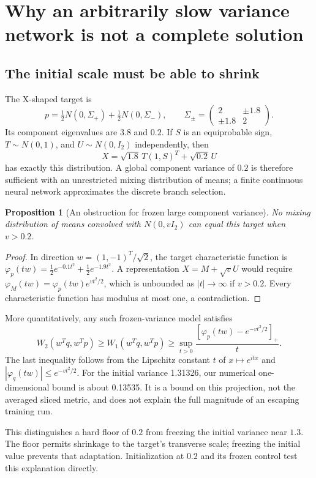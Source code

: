 \documentclass[11pt,a4paper]{article}
\newtheorem{proposition}{Proposition}[section]
\begin{document}
\section{Why an arbitrarily slow variance network is not a complete solution}
\subsection{The initial scale must be able to shrink}
The X-shaped target is
\[
 p=\tfrac12N(0,\Sigma_+)+\tfrac12N(0,\Sigma_-),\qquad
 \Sigma_\pm=\begin{pmatrix}2&\pm1.8\\\pm1.8&2\end{pmatrix}.
\]
Its component eigenvalues are $3.8$ and $0.2$. If $S$ is an equiprobable sign,
$T\sim N(0,1)$, and $U\sim N(0,I_2)$ independently, then
\[
 X=\sqrt{1.8}\,T(1,S)^T+\sqrt{0.2}\,U
\]
has exactly this distribution. A global component variance of $0.2$ is
therefore sufficient with an unrestricted mixing distribution of means; a
finite continuous neural network approximates the discrete branch selection.

\begin{proposition}[An obstruction for frozen large component variance]
No mixing distribution of means convolved with $N(0,vI_2)$ can equal this
target when $v>0.2$.
\end{proposition}
\begin{proof}
In direction $w=(1,-1)^T/\sqrt2$, the target characteristic function is
$\varphi_p(tw)=\tfrac12e^{-0.1t^2}+\tfrac12e^{-1.9t^2}$. A representation
$X=M+\sqrt vU$ would require
$\varphi_M(tw)=\varphi_p(tw)e^{vt^2/2}$, which is unbounded as
$|t|\to\infty$ if $v>0.2$. Every characteristic function has modulus at most
one, a contradiction.
\end{proof}

More quantitatively, any such frozen-variance model satisfies
\[
 W_2(w^Tq,w^Tp)\ge W_1(w^Tq,w^Tp)
 \ge\sup_{t>0}\frac{[\varphi_p(tw)-e^{-vt^2/2}]_+}{t}.
\]
The last inequality follows from the Lipschitz constant $t$ of
$x\mapsto e^{itx}$ and $|\varphi_q(tw)|\le e^{-vt^2/2}$.
For the initial variance 1.31326, our numerical one-dimensional bound is
about 0.13535. It is a bound on this projection, not the averaged sliced
metric, and does not explain the full magnitude of an escaping training run.

This distinguishes a hard floor of $0.2$ from freezing the initial variance
near $1.3$. The floor permits shrinkage to the target's transverse scale;
freezing the initial value prevents that adaptation. Initialization at $0.2$
and its frozen control test this explanation directly.
\end{document}
